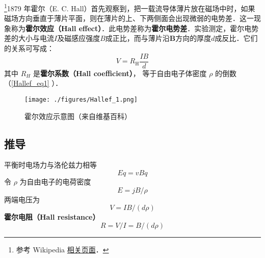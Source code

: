 
\begin{issues}
\issueDraft
\end{issues}

\footnote{参考 Wikipedia \href{https://en.wikipedia.org/wiki/Hall_effect}{相关页面}．}1879 年霍尔（E. C. Hall）首先观察到，把一载流导体薄片放在磁场中时，如果磁场方向垂直于薄片平面，则在薄片的上、下两侧面会出现微弱的电势差．这一现象称为\textbf{霍尔效应（Hall effect）}．此电势差称为\textbf{霍尔电势差}．实验测定，霍尔电势差的大小与电流$I$及磁感应强度$B$成正比，而与薄片沿$\mathbf B$方向的厚度$d$成反比．它们的关系可写成：
\begin{equation}
V = R_{\mathrm{H}} \frac{I B}{d}
\end{equation}
其中 $R_H$ 是\textbf{霍尔系数（Hall coefficient）}， 等于自由电子体密度 $\rho$ 的倒数（\autoref{Hallef_eq1} ）．

\begin{figure}[ht]
\centering
\texttt{[image: ./figures/Hallef\_1.png]}
\caption{霍尔效应示意图（来自维基百科）} \label{Hallef_fig1}
\end{figure}

\subsection{推导}
平衡时电场力与洛伦兹力相等
\begin{equation}
Eq = vBq
\end{equation}
令 $\rho$ 为自由电子的电荷密度
\begin{equation}
E = jB/\rho
\end{equation}
两端电压为
\begin{equation}\label{Hallef_eq1}
V = IB/(d\rho)
\end{equation}
\textbf{霍尔电阻（Hall resistance）}
\begin{equation}
R = V/I = B/(d\rho)
\end{equation}
